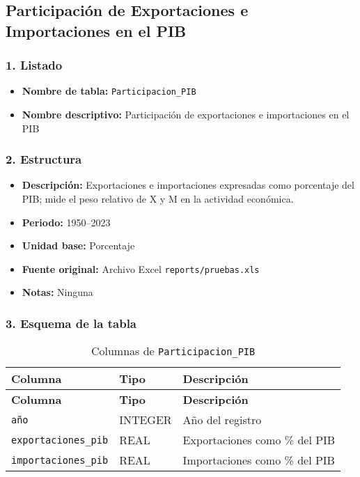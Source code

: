 \documentclass[12pt,a4paper]{article}
\begin{document}
\newpage
\subsection{Participación de Exportaciones e Importaciones en el PIB }

\subsubsection*{1. Listado}
\begin{itemize}
  \item \textbf{Nombre de tabla:} \texttt{Participacion\_PIB}
  \item \textbf{Nombre descriptivo:} Participación de exportaciones e importaciones en el PIB
\end{itemize}

\subsubsection*{2. Estructura}
\begin{itemize}
  \item \textbf{Descripción:} Exportaciones e importaciones expresadas como porcentaje del PIB; mide el peso relativo de X y M en la actividad económica.
  \item \textbf{Periodo:} 1950--2023
  \item \textbf{Unidad base:} Porcentaje
  \item \textbf{Fuente original:} Archivo Excel \texttt{reports/pruebas.xls}
  \item \textbf{Notas:} Ninguna
\end{itemize}

\subsubsection*{3. Esquema de la tabla}
\begin{longtable}{@{}lll@{}}
\caption{Columnas de \texttt{Participacion\_PIB}}\\
\toprule
\textbf{Columna} & \textbf{Tipo} & \textbf{Descripción} \\
\midrule
\endfirsthead
\toprule
\textbf{Columna} & \textbf{Tipo} & \textbf{Descripción} \\
\midrule
\endhead
\bottomrule
\endfoot
\texttt{año}                & INTEGER & Año del registro \\
\texttt{exportaciones\_pib} & REAL    & Exportaciones como \% del PIB \\
\texttt{importaciones\_pib} & REAL    & Importaciones como \% del PIB \\
\end{longtable}
\end{document}
